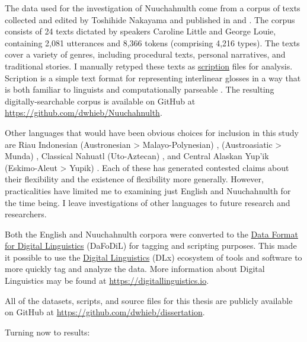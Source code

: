 The data used for the investigation of Nuuchahnulth come from a corpus of texts collected and edited by Toshihide Nakayama and published in \textcite{Little2003} and \textcite{Louie2003}. The corpus consists of 24 texts dictated by speakers Caroline Little and George Louie, containing 2,081 utterances and 8,366 tokens (comprising 4,216 types). The texts cover a variety of genres, including procedural texts, personal narratives, and traditional stories. I manually retyped these texts as \href{https://scription.digitallinguistics.io}{scription} files for analysis. Scription is a simple text format for representing interlinear glosses in a way that is both familiar to linguists and computationally parseable \parencite{Hieber2020b}. The resulting digitally-searchable corpus is available on GitHub at \url{https://github.com/dwhieb/Nuuchahnulth}.

Other languages that would have been obvious choices for inclusion in this study are Riau Indonesian (Austronesian > Malayo-Polynesian) \parencite{Gil1994},  (Austroasiatic > Munda) \parencites{EvansOsada2005}{HengeveldRijkhoff2005}, Classical Nahuatl (Uto-Aztecan) \parencites{Launey1994}{Launey2004}, and Central Alaskan Yup'ik (Eskimo-Aleut > Yupik) \parencites{Thalbitzer1922}{Sadock1999}{Mithun2017}. Each of these has generated contested claims about their flexibility and the existence of flexibility more generally. However, practicalities have limited me to examining just English and Nuuchahnulth for the time being. I leave investigations of other languages to future research and researchers.

Both the English and Nuuchahnulth corpora were converted to the \href{https://format.digitallinguistics.io}{Data Format for Digital Linguistics} (DaFoDiL)  for tagging and scripting purposes. This made it possible to use the \href{https://digitallinguistics.io}{Digital Linguistics} (DLx) ecosystem of tools and software to more quickly tag and analyze the data. More information about Digital Linguistics may be found at \url{https://digitallinguistics.io}.

All of the datasets, scripts, and source files for this thesis are publicly available on GitHub at \url{https://github.com/dwhieb/dissertation}.

Turning now to results:

